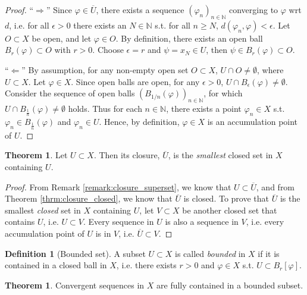 \documentclass[12pt, a4paper]{article}
\numberwithin{equation}{section}
\theoremstyle{definition}
\theoremstyle{definition}
\newtheorem{defn}[thm]{Definition} %
\newtheorem{theorem}[thm]{Theorem}
\begin{document}
	\begin{proof}
		\enquote{$\Longrightarrow$} Since $\varphi\in\overline{U}$, there exists a sequence $\left(\varphi_n\right)_{n\in\mathbb N}$ converging to $\varphi$ wrt $d$, i.e. for all $\epsilon > 0$ there exists an $N\in\mathbb N$ s.t. for all $n\geq N$, $d(\varphi_n, \varphi) < \epsilon$. Let $O\subset X$ be open, and let $\varphi\in O$. By definition, there exists an open ball $B_{r}(\varphi)\subset O$ with $r > 0$. Choose $\epsilon = r$ and $\psi = x_{N}\in U$, then $\psi\in B_{r}(\varphi) \subset O$.
		
		\enquote{$\Longleftarrow$} By assumption, for any non-empty open set $O\subset X$, $U\cap O\ne\emptyset$, where $U\subset X$. Let $\varphi\in X$. Since open balls are open, for any $\epsilon > 0$, $U\cap B_{\epsilon}(\varphi)\ne\emptyset$. Consider the sequence of open balls $\left( B_{1/n}(\varphi)\right)_{n\in\mathbb N}$, for which $U\cap B_{\frac{1}{n}}(\varphi) \ne \emptyset$ holds. Thus for each $n\in\mathbb N$, there exists a point $\varphi_{n}\in X$ s.t. $\varphi_n \in B_{\frac{1}{n}}(\varphi)$ and $\varphi_n\in U$. Hence, by definition, $\varphi\in X$ is an accumulation point of $U$.
	\end{proof}
	
	\begin{theorem}
		Let $U\subset X$. Then its closure, $\overline{U}$, is the \textit{smallest} closed set in $X$ containing $U$.
	\end{theorem}

	\begin{proof}
		From Remark \ref{remark:closure_superset}, we know that $U\subset \overline{U}$, and from Theorem \ref{thrm:closure_closed}, we know that $\overline{U}$ is closed. To prove that $\overline{U}$ is the smallest \textit{closed} set in $X$ containing $U$, let $V\subset X$ be another closed set that contains $U$, i.e. $U\subset V$. Every sequence in $U$ is also a sequence in $V$, i.e. every accumulation point of $U$ is in $V$, i.e. $\overline{U}\subset V$.
	\end{proof}

	\begin{defn}[Bounded set]\label{defn:bounded_set}
		A subset $U\subset X$ is called \textit{bounded} in $X$ if it is contained in a closed ball in $X$, i.e. there exists $r > 0$ and $\varphi \in X$ s.t. $U\subset B_{r}[\varphi]$.
	\end{defn}

	\begin{theorem}
		Convergent sequences in $X$ are fully contained in a bounded subset.
	\end{theorem}
	
\end{document}
